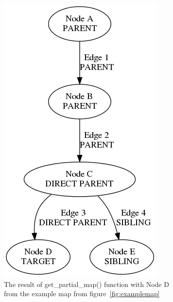 \begin{figure}
    \centering
    \begin{subfigure}{0.4\textwidth}
        \centering
        \includegraphics[height=.4\textheight]{img/examplemap_partial_d.png}
        \caption{The result of get\_partial\_map() function with Node D from the example map from figure~\protect\ref{fig:examplemap}}
        \label{fig:examplemap_partial_d}
    \end{subfigure}
    \qquad
    \begin{subfigure}{0.4\textwidth}
        \centering

\end{subfigure}
\end{figure}
